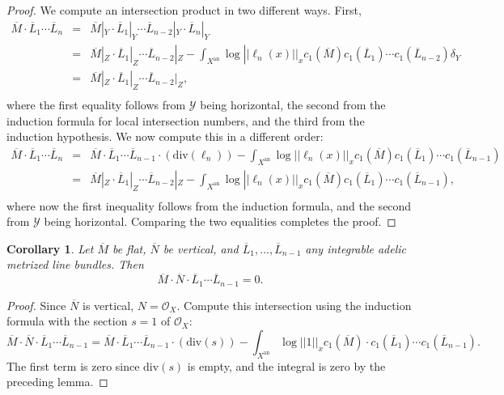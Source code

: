 \documentclass[times, doublespace]{amsart}
\numberwithin{equation}{section}
\theoremstyle{plain}
\newtheorem{cor}[equation]{Corollary}
\theoremstyle{definition}
\DeclareMathOperator{\an}{an}
\renewcommand{\div}{\text{div}}
\newcommand{\cO}{\mathcal{O}}
\newcommand{\cY}{\mathcal{Y}}
\begin{document}
\begin{proof}
We compute an intersection product in two different ways. First,
\begin{eqnarray*}
\overline M\cdot\overline L_1\cdots\overline L_n&=&\overline M|_Y\cdot\overline L_1|_Y\cdots\overline L_{n-2}|_Y\cdot\overline L_n|_Y\\
&=& \overline M|_Z\cdot\overline L_1|_Z\cdots\overline L_{n-2}|_Z-\int_{X^{\an}}\log||\ell_n(x)||_xc_1(\overline M)c_1(\overline L_1)\cdots c_1(\overline L_{n-2})\delta_Y\\
&=&\overline M|_Z\cdot\overline L_1|_Z\cdots\overline L_{n-2}|_Z,\\
\end{eqnarray*}
where the first equality follows from $\cY$ being horizontal, the second from the induction formula for local intersection numbers, and the third from the induction hypothesis. We now compute this in a different order:
\begin{eqnarray*}
\overline M\cdot\overline L_1\cdots\overline L_n&=&\overline M\cdot\overline L_1\cdots\overline L_{n-1}\cdot(\div(\ell_n))-\int_{X^{\an}}\log||\ell_n(x)||_xc_1(\overline M)c_1(\overline L_1)\cdots c_1(\overline L_{n-1})\\
&=&\overline M|_Z\cdot\overline L_1|_Z\cdots\overline L_{n-2}|_Z-\int_{X^{\an}}\log||\ell_n(x)||_xc_1(\overline M)c_1(\overline L_1)\cdots c_1(\overline L_{n-1}),\\
\end{eqnarray*}
where now the first inequality follows from the induction formula, and the second from $\cY$ being horizontal. Comparing the two equalities completes the proof.
\end{proof}

\begin{cor}\label{flatzerocor}
Let $\overline M$ be flat, $\overline N$ be vertical, and $\overline L_1,\dots,\overline L_{n-1}$ any integrable adelic metrized line bundles. Then
\[\overline M\cdot\overline N\cdot\overline L_1\cdots\overline L_{n-1}=0.\]
\end{cor}
\begin{proof}
Since $\overline N$ is vertical, $N=\cO_X$. Compute this intersection using the induction formula with the section $s=1$ of $\cO_X$:
\[\overline M\cdot\overline N\cdot\overline L_1\cdots\overline L_{n-1}=\overline M\cdot\overline L_1\cdots\overline L_{n-1}\cdot(\div (s))-\int_{X^{\an}}\log||1||_xc_1(\overline M)\cdot c_1(\overline L_1)\cdots c_1(\overline L_{n-1}).\]
The first term is zero since $\div(s)$ is empty, and the integral is zero by the preceding lemma.
\end{proof}
\end{document}
